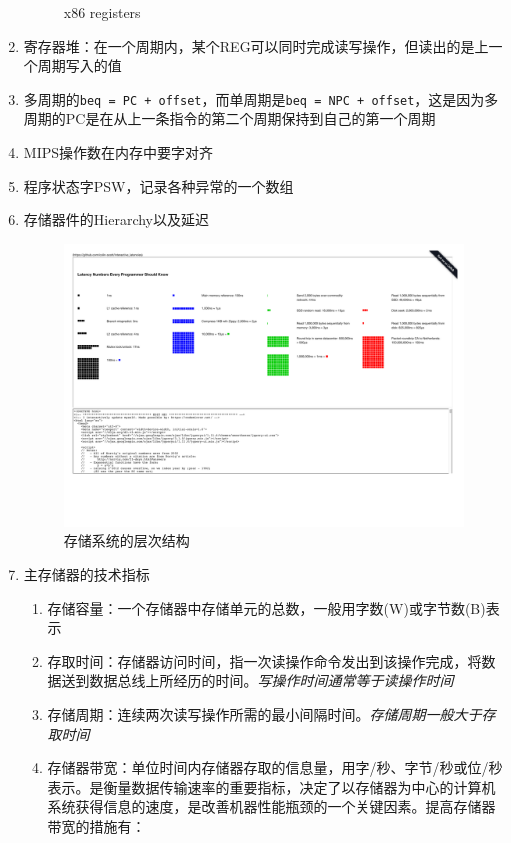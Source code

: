 \documentclass[]{report}
\begin{document}
\begin{enumerate}
\begin{figure}[h!]
\begin{minipage}{40em}
				\caption{x86 registers}
			\end{minipage}
		\end{figure}
		\item 寄存器堆：在一个周期内，某个REG可以同时完成读写操作，但读出的是上一个周期写入的值
		\item 多周期的\verb|beq = PC + offset|，而单周期是\verb|beq = NPC + offset|，这是因为多周期的PC是在从上一条指令的第二个周期保持到自己的第一个周期
		\item MIPS操作数在内存中要字对齐
		\item 程序状态字PSW，记录各种异常的一个数组
		\item 存储器件的Hierarchy以及延迟
		\begin{figure}[h]
			\centering
			\begin{minipage}{40em}
				\centering
				\includegraphics[scale = 0.3]{images/Latency_of_Storage_Hierarchy.pdf}
				\caption{存储系统的层次结构}
			\end{minipage}
		\end{figure}
		\item 主存储器的技术指标
		\begin{enumerate}
			\item 存储容量：一个存储器中存储单元的总数，一般用字数(W)或字节数(B)表示
			\item 存取时间：存储器访问时间，指一次读操作命令发出到该操作完成，将数据送到数据总线上所经历的时间。\textit{写操作时间通常等于读操作时间}
			\item 存储周期：连续两次读写操作所需的最小间隔时间。\textit{存储周期一般大于存取时间}
			\item 存储器带宽：单位时间内存储器存取的信息量，用字/秒、字节/秒或位/秒表示。是衡量数据传输速率的重要指标，决定了以存储器为中心的计算机系统获得信息的速度，是改善机器性能瓶颈的一个关键因素。提高存储器带宽的措施有：

\end{enumerate}
\end{enumerate}
\end{document}
